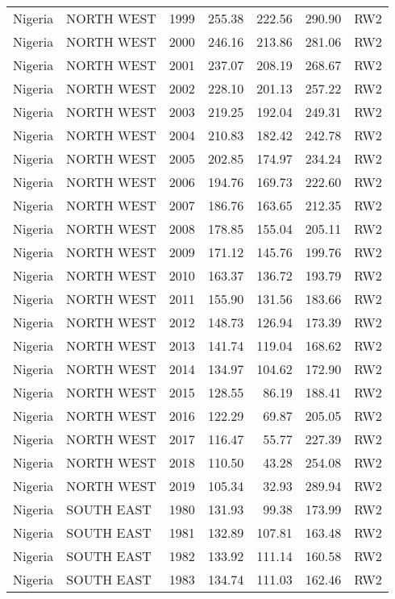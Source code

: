\begin{longtable}{lllrrrl}
  Nigeria & NORTH WEST & 1999 & 255.38 & 222.56 & 290.90 & RW2 \\ 
  Nigeria & NORTH WEST & 2000 & 246.16 & 213.86 & 281.06 & RW2 \\ 
  Nigeria & NORTH WEST & 2001 & 237.07 & 208.19 & 268.67 & RW2 \\ 
  Nigeria & NORTH WEST & 2002 & 228.10 & 201.13 & 257.22 & RW2 \\ 
  Nigeria & NORTH WEST & 2003 & 219.25 & 192.04 & 249.31 & RW2 \\ 
  Nigeria & NORTH WEST & 2004 & 210.83 & 182.42 & 242.78 & RW2 \\ 
  Nigeria & NORTH WEST & 2005 & 202.85 & 174.97 & 234.24 & RW2 \\ 
  Nigeria & NORTH WEST & 2006 & 194.76 & 169.73 & 222.60 & RW2 \\ 
  Nigeria & NORTH WEST & 2007 & 186.76 & 163.65 & 212.35 & RW2 \\ 
  Nigeria & NORTH WEST & 2008 & 178.85 & 155.04 & 205.11 & RW2 \\ 
  Nigeria & NORTH WEST & 2009 & 171.12 & 145.76 & 199.76 & RW2 \\ 
  Nigeria & NORTH WEST & 2010 & 163.37 & 136.72 & 193.79 & RW2 \\ 
  Nigeria & NORTH WEST & 2011 & 155.90 & 131.56 & 183.66 & RW2 \\ 
  Nigeria & NORTH WEST & 2012 & 148.73 & 126.94 & 173.39 & RW2 \\ 
  Nigeria & NORTH WEST & 2013 & 141.74 & 119.04 & 168.62 & RW2 \\ 
  Nigeria & NORTH WEST & 2014 & 134.97 & 104.62 & 172.90 & RW2 \\ 
  Nigeria & NORTH WEST & 2015 & 128.55 & 86.19 & 188.41 & RW2 \\ 
  Nigeria & NORTH WEST & 2016 & 122.29 & 69.87 & 205.05 & RW2 \\ 
  Nigeria & NORTH WEST & 2017 & 116.47 & 55.77 & 227.39 & RW2 \\ 
  Nigeria & NORTH WEST & 2018 & 110.50 & 43.28 & 254.08 & RW2 \\ 
  Nigeria & NORTH WEST & 2019 & 105.34 & 32.93 & 289.94 & RW2 \\ 
  Nigeria & SOUTH EAST & 1980 & 131.93 & 99.38 & 173.99 & RW2 \\ 
  Nigeria & SOUTH EAST & 1981 & 132.89 & 107.81 & 163.48 & RW2 \\ 
  Nigeria & SOUTH EAST & 1982 & 133.92 & 111.14 & 160.58 & RW2 \\ 
  Nigeria & SOUTH EAST & 1983 & 134.74 & 111.03 & 162.46 & RW2 \\ 

\end{longtable}
